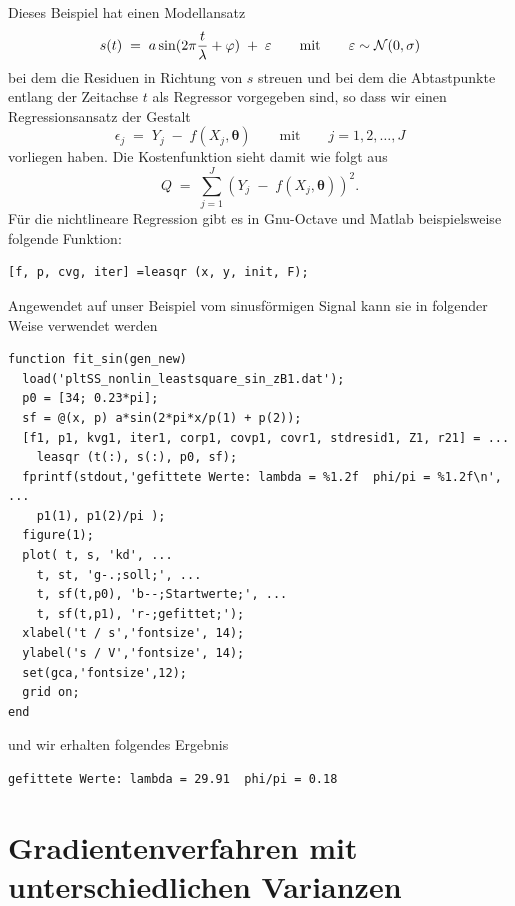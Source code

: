 Dieses Beispiel hat einen Modellansatz
\begin{equation}
s(t) \; = \; a \sin(2\pi \frac{t}{\lambda} + \varphi) \; + \; \varepsilon \qquad 
\textrm{mit} \qquad \varepsilon \sim {\cal N}(0,\sigma) 
\end{equation}
bei dem die Residuen in Richtung von $s$ streuen und bei dem die Abtastpunkte
entlang der Zeitachse $t$ als Regressor vorgegeben sind, so dass
wir einen Regressionsansatz der Gestalt
\begin{equation}
\epsilon_j \; = \; Y_j \; - \; f(X_j, \boldsymbol{\theta}) \qquad \textrm{mit} \qquad 
j=1, 2,\dots, J 
\end{equation}
vorliegen haben. Die Kostenfunktion sieht damit wie folgt aus
\begin{equation}
Q \; = \; \sum\limits_{j=1}^J \left(Y_j \; - \; f(X_j, \boldsymbol{\theta})\right)^2.
\end{equation}
Für die nichtlineare Regression gibt es in Gnu-Octave und Matlab beispielsweise folgende
Funktion:
\begin{verbatim}
[f, p, cvg, iter] =leasqr (x, y, init, F);
\end{verbatim}
Angewendet auf unser Beispiel vom sinusförmigen Signal kann sie in folgender Weise
verwendet werden
\begin{verbatim}
function fit_sin(gen_new)
  load('pltSS_nonlin_leastsquare_sin_zB1.dat');
  p0 = [34; 0.23*pi];
  sf = @(x, p) a*sin(2*pi*x/p(1) + p(2));
  [f1, p1, kvg1, iter1, corp1, covp1, covr1, stdresid1, Z1, r21] = ...
    leasqr (t(:), s(:), p0, sf);
  fprintf(stdout,'gefittete Werte: lambda = %1.2f  phi/pi = %1.2f\n', ...
    p1(1), p1(2)/pi );
  figure(1);
  plot( t, s, 'kd', ...
    t, st, 'g-.;soll;', ...
    t, sf(t,p0), 'b--;Startwerte;', ...
    t, sf(t,p1), 'r-;gefittet;');
  xlabel('t / s','fontsize', 14);
  ylabel('s / V','fontsize', 14);
  set(gca,'fontsize',12);
  grid on;
end
\end{verbatim}
und wir erhalten folgendes Ergebnis
\begin{verbatim}
gefittete Werte: lambda = 29.91  phi/pi = 0.18
\end{verbatim}

\section{Gradientenverfahren mit unterschiedlichen Varianzen}
\label{unterschiedVar}

